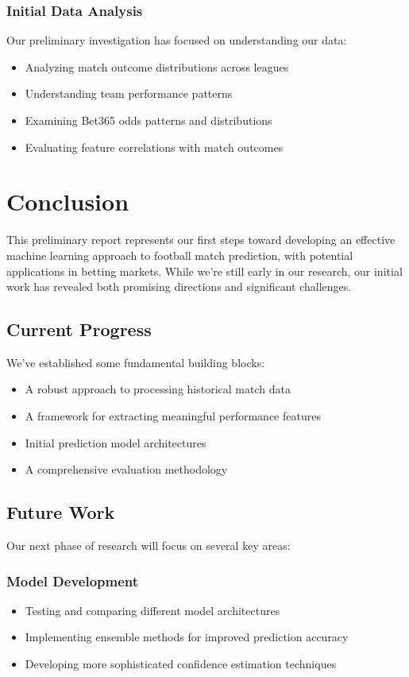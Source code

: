 \documentclass[conference]{IEEEtran}
\begin{document}
\subsubsection{Initial Data Analysis}
Our preliminary investigation has focused on understanding our data:
\begin{itemize}
\item Analyzing match outcome distributions across leagues
\item Understanding team performance patterns
\item Examining Bet365 odds patterns and distributions
\item Evaluating feature correlations with match outcomes
\end{itemize}

\section{Conclusion}
This preliminary report represents our first steps toward developing an effective machine learning approach to football match prediction, with potential applications in betting markets. While we're still early in our research, our initial work has revealed both promising directions and significant challenges.

\subsection{Current Progress}
We've established some fundamental building blocks:
\begin{itemize}
\item A robust approach to processing historical match data
\item A framework for extracting meaningful performance features
\item Initial prediction model architectures
\item A comprehensive evaluation methodology
\end{itemize}

\subsection{Future Work}
Our next phase of research will focus on several key areas:

\subsubsection{Model Development}
\begin{itemize}
\item Testing and comparing different model architectures
\item Implementing ensemble methods for improved prediction accuracy
\item Developing more sophisticated confidence estimation techniques
\end{itemize}
\end{document}
